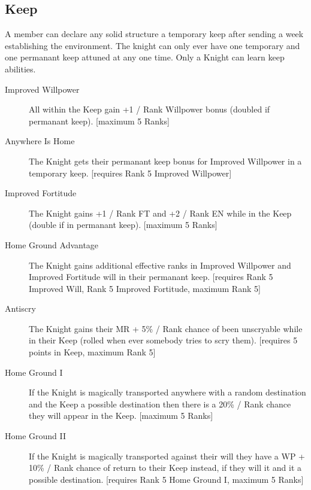 \documentclass[a4paper]{article}
\begin{document}
\begin{multicols*}{3}
\begin{description}
\end{description}

\subsection{Keep}

A member can declare any solid structure a temporary keep after
sending a week establishing the environment.  The knight can only ever
have one temporary and one permanant keep attuned at any one time.
Only a Knight can learn keep abilities.

\begin{description}

\item[Improved Willpower] All within the Keep gain +1 / Rank Willpower
  bonus (doubled if permanant keep).  [maximum 5 Ranks]

\item[Anywhere Is Home] The Knight gets their permanant keep bonus for
  Improved Willpower in a temporary keep.  [requires Rank 5 Improved
    Willpower]

\item[Improved Fortitude] The Knight gains +1 / Rank FT and +2 / Rank
  EN while in the Keep (double if in permanant keep).  [maximum 5
    Ranks]

\item[Home Ground Advantage] The Knight gains additional effective
  ranks in Improved Willpower and Improved Fortitude will in their
  permanant keep.  [requires Rank 5 Improved Will, Rank 5 Improved
    Fortitude, maximum Rank 5]

\item[Antiscry] The Knight gains their MR + 5\% / Rank chance of been
  unscryable while in their Keep (rolled when ever somebody tries to
    scry them).  [requires 5 points in Keep, maximum Rank 5]

\item[Home Ground I] If the Knight is magically transported anywhere
  with a random destination and the Keep a possible destination then
  there is a 20\% / Rank chance they will appear in the Keep.
  [maximum 5 Ranks]

\item[Home Ground II] If the Knight is magically transported against
  their will they have a WP + 10\% / Rank chance of return to their
  Keep instead, if they will it and it a possible destination.
  [requires Rank 5 Home Ground I, maximum 5 Ranks]


\end{description}
\end{multicols*}
\end{document}
